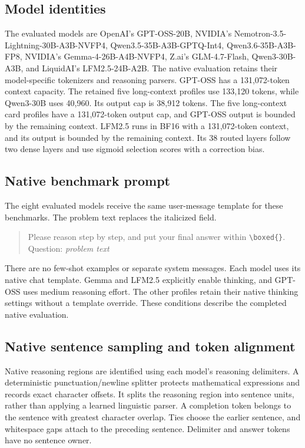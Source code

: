 

\subsection{Model identities}
The evaluated models are OpenAI's GPT-OSS-20B, NVIDIA's Nemotron-3.5-Lightning-30B-A3B-NVFP4, Qwen3.5-35B-A3B-GPTQ-Int4, Qwen3.6-35B-A3B-FP8, NVIDIA's Gemma-4-26B-A4B-NVFP4, Z.ai's GLM-4.7-Flash, Qwen3-30B-A3B, and LiquidAI's LFM2.5-24B-A2B.
%
The native evaluation retains their model-specific tokenizers and reasoning parsers.
%
GPT-OSS has a 131,072-token context capacity.
%
The retained five long-context profiles use 133,120 tokens, while Qwen3-30B uses 40,960.
%
Its output cap is 38,912 tokens.
%
The five long-context card profiles have a 131,072-token output cap, and GPT-OSS output is bounded by the remaining context.
%
LFM2.5 runs in BF16 with a 131,072-token context, and its output is bounded by the remaining context.
%
Its 38 routed layers follow two dense layers and use sigmoid selection scores with a correction bias.
%

\subsection{Native benchmark prompt}
\label{app:native-prompt}

The eight evaluated models receive the same user-message template for these benchmarks.
%
The problem text replaces the italicized field.
%
\begin{quote}\small
Please reason step by step, and put your final answer within \verb|\boxed{}|.\\ Question: \emph{problem text}
\end{quote}
There are no few-shot examples or separate system messages.
%
Each model uses its native chat template.
%
Gemma and LFM2.5 explicitly enable thinking, and GPT-OSS uses medium reasoning effort.
%
The other profiles retain their native thinking settings without a template override.
%
These conditions describe the completed native evaluation.
%


\subsection{Native sentence sampling and token alignment}

Native reasoning regions are identified using each model's reasoning delimiters.
%
A deterministic punctuation/newline splitter protects mathematical expressions and records exact character offsets.
%
It splits the reasoning region into sentence units, rather than applying a learned linguistic parser.
%
A completion token belongs to the sentence with greatest character overlap.
%
Ties choose the earlier sentence, and whitespace gaps attach to the preceding sentence.
%
Delimiter and answer tokens have no sentence owner.
%

